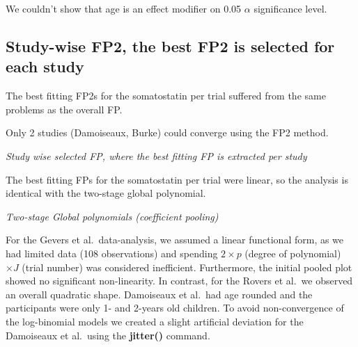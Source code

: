 \documentclass[14pt,]{article}
\begin{document}
We couldn't show that age is an effect modifier on 0.05 \(\alpha\)
significance level.

\hypertarget{study-wise-fp2-the-best-fp2-is-selected-for-each-study}{%
\subsection{Study-wise FP2, the best FP2 is selected for each
study}\label{study-wise-fp2-the-best-fp2-is-selected-for-each-study}}

The best fitting FP2s for the somatostatin per trial suffered from the
same problems as the overall FP.

Only 2 studies (Damoiseaux, Burke) could converge using the FP2 method.

\emph{Study wise selected FP, where the best fitting FP is extracted per
study}

The best fitting FPs for the somatostatin per trial were linear, so the
analysis is identical with the two-stage global polynomial.

\emph{Two-stage Global polynomials (coefficient pooling)}

For the Gevers et al.~data-analysis, we assumed a linear functional
form, as we had limited data (108 observations) and spending
\(2 \times p\) (degree of polynomial) \(\times J\) (trial number) was
considered inefficient. Furthermore, the initial pooled plot showed no
significant non-linearity. In contrast, for the Rovers et al.~we
observed an overall quadratic shape. Damoiseaux et al.~had age rounded
and the participants were only 1- and 2-years old children. To avoid
non-convergence of the log-binomial models we created a slight
artificial deviation for the Damoiseaux et al.~using the
\textbf{jitter()} command.
\end{document}
